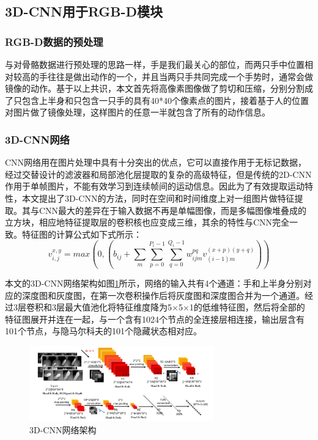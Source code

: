 \documentclass[a4paper, 12pt]{article}
\begin{document}
\subsection{3D-CNN用于RGB-D模块}
\subsubsection{RGB-D数据的预处理}
与对骨骼数据进行预处理的思路一样，手是我们最关心的部位，而两只手中位置相对较高的手往往是做出动作的一个，并且当两只手共同完成一个手势时，通常会做镜像的动作。基于以上共识，本文首先将高像素图像做了剪切和压缩，分别分割成了只包含上半身和只包含一只手的具有40*40个像素点的图片，接着基于人的位置对图片做了镜像处理，这样图片的任意一半就包含了所有的动作信息。

\subsubsection{3D-CNN网络}
CNN网络用在图片处理中具有十分突出的优点，它可以直接作用于无标记数据，经过交替设计的滤波器和局部池化层提取的复杂的高级特征，但是传统的2D-CNN作用于单帧图片，不能有效学习到连续帧间的运动信息\cite{p7}。因此为了有效提取运动特性，本文提出了3D-CNN的方法，同时在空间和时间维度上对一组图片做特征提取。其与CNN最大的差异在于输入数据不再是单幅图像，而是多幅图像堆叠成的立方块，相应地特征提取层的卷积核也应变成三维，其余的特性与CNN完全一致。特征图的计算公式如下式所示：
\begin{equation}
  v_{i,j}^{x,y} = max(0, (b_{ij} + \sum_m \sum_{p=0}^{P_i-1} \sum_{q=0}^{Q_i-1} w_{ijm}^{pq}v_{(i-1)m}^{(x+p)(y+q)}))
\end{equation}

本文的3D-CNN网络架构如图\ref{fig:3}所示，网络的输入共有4个通道：手和上半身分别对应的深度图和灰度图，在第一次卷积操作后将灰度图和深度图合并为一个通道。经过3层卷积和3层最大值池化将特征维度降为5×5×1的低维特征图，然后将全部的特征图展开并连在一起，与一个含有1024个节点的全连接层相连接，输出层含有101个节点，与隐马尔科夫的101个隐藏状态相对应。
\begin{figure}[ht]
  \centering
  \includegraphics[width=8cm]{cnnArchitecture.png}
  \caption{\label{fig:3}3D-CNN网络架构}
\end{figure}
\end{document}
